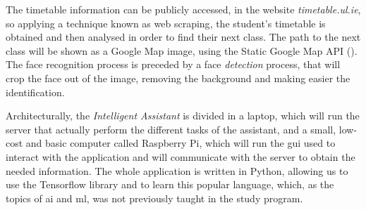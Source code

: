 The timetable information can be publicly accessed, in the website \textit{timetable.ul.ie}, so applying a technique known as web \gls{scraping}, the student's timetable is obtained and then analysed in order to find their next class. The path to the next class will be shown as a Google Map image, using the Static Google Map API (\cite{google_maps_static}). The face recognition process is preceded by a face \textit{detection} process, that will crop the face out of the image, removing the background and making easier the identification.

\clearpage

Architecturally, the \textit{Intelligent Assistant} is divided in a laptop, which will run the server that actually perform the different tasks of the assistant, and a small, low-cost and basic computer called Raspberry Pi, which will run the \gls{gui} used to interact with the application and will communicate with the server to obtain the needed information. The whole application is written in Python, allowing us to use the Tensorflow library and to learn this popular language, which, as the topics of \gls{ai} and \gls{ml}, was not previously taught in the study program. 

